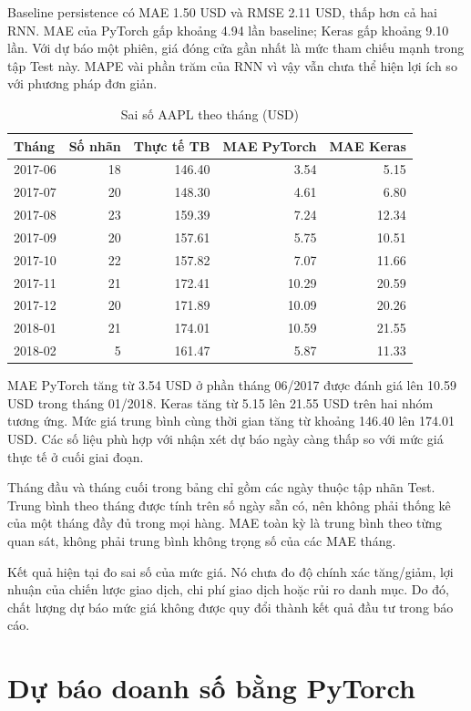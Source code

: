 \documentclass[12pt,a4paper]{report}
\begin{document}
Baseline persistence có MAE 1.50 USD và RMSE 2.11 USD, thấp hơn cả hai RNN. MAE của PyTorch gấp khoảng 4.94 lần baseline; Keras gấp khoảng 9.10 lần. Với dự báo một phiên, giá đóng cửa gần nhất là mức tham chiếu mạnh trong tập Test này. MAPE vài phần trăm của RNN vì vậy vẫn chưa thể hiện lợi ích so với phương pháp đơn giản.

\begin{table}[H]\centering\small
\setlength{\tabcolsep}{4pt}
\caption{Sai số AAPL theo tháng (USD)}\label{tab:stock-monthly}
\begin{tabular}{@{}lrrrr@{}}\toprule
Tháng & Số nhãn & Thực tế TB & MAE PyTorch & MAE Keras \\\midrule
2017-06 & 18 & 146.40 & 3.54 & 5.15 \\
2017-07 & 20 & 148.30 & 4.61 & 6.80 \\
2017-08 & 23 & 159.39 & 7.24 & 12.34 \\
2017-09 & 20 & 157.61 & 5.75 & 10.51 \\
2017-10 & 22 & 157.82 & 7.07 & 11.66 \\
2017-11 & 21 & 172.41 & 10.29 & 20.59 \\
2017-12 & 20 & 171.89 & 10.09 & 20.26 \\
2018-01 & 21 & 174.01 & 10.59 & 21.55 \\
2018-02 & 5 & 161.47 & 5.87 & 11.33 \\
\bottomrule\end{tabular}
\end{table}

MAE PyTorch tăng từ 3.54 USD ở phần tháng 06/2017 được đánh giá lên 10.59 USD trong tháng 01/2018. Keras tăng từ 5.15 lên 21.55 USD trên hai nhóm tương ứng. Mức giá trung bình cùng thời gian tăng từ khoảng 146.40 lên 174.01 USD. Các số liệu phù hợp với nhận xét dự báo ngày càng thấp so với mức giá thực tế ở cuối giai đoạn.

Tháng đầu và tháng cuối trong bảng chỉ gồm các ngày thuộc tập nhãn Test. Trung bình theo tháng được tính trên số ngày sẵn có, nên không phải thống kê của một tháng đầy đủ trong mọi hàng. MAE toàn kỳ là trung bình theo từng quan sát, không phải trung bình không trọng số của các MAE tháng.

Kết quả hiện tại đo sai số của mức giá. Nó chưa đo độ chính xác tăng/giảm, lợi nhuận của chiến lược giao dịch, chi phí giao dịch hoặc rủi ro danh mục. Do đó, chất lượng dự báo mức giá không được quy đổi thành kết quả đầu tư trong báo cáo.

\section{Dự báo doanh số bằng PyTorch}
\end{document}
